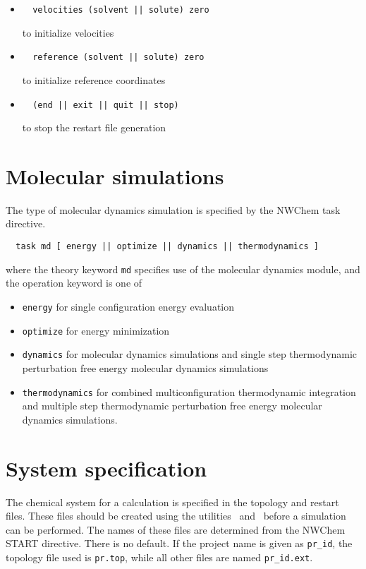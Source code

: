 \begin{itemize}
\item
\begin{verbatim}
  velocities (solvent || solute) zero
\end{verbatim}
to initialize velocities

\item
\begin{verbatim}
  reference (solvent || solute) zero
\end{verbatim}
to initialize reference coordinates

\item
\begin{verbatim}
  (end || exit || quit || stop)
\end{verbatim}
to stop the restart file generation
\end{itemize}

\section{Molecular simulations}
The type of molecular dynamics simulation is specified by the
NWChem task directive.
\begin{verbatim}
  task md [ energy || optimize || dynamics || thermodynamics ]
\end{verbatim}
where the theory keyword {\tt md} specifies use of the molecular
dynamics module, and the operation keyword is one of
\begin{itemize}
\item
{\tt energy} for single configuration energy evaluation
\item
{\tt optimize} for energy minimization
\item
{\tt dynamics} for molecular dynamics simulations and single step
thermodynamic perturbation free energy molecular dynamics simulations
\item
{\tt thermodynamics} for combined multiconfiguration thermodynamic
integration and multiple step thermodynamic perturbation free
energy molecular dynamics simulations.
\end{itemize}

\section{System specification}
The chemical system for a calculation is specified in the topology
and restart files. These files should be created using the utilities
\nwtop\ and \nwrst\ before a simulation can be performed.
The names of these files are determined from the NWChem START directive.
There is no default. If the project name is given as {\tt pr\_id},
the topology file used is {\tt pr.top}, while all other files
are named {\tt pr\_id.ext}.

